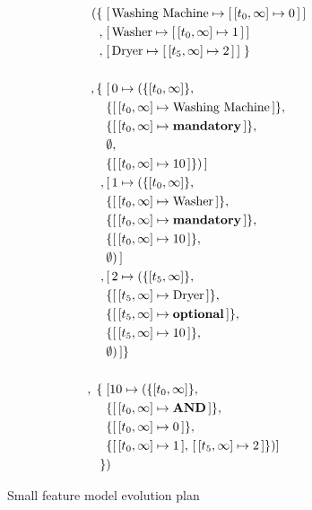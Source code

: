 \begin{figure}
  \begin{align*}
    ( \{ \; & \mapping{\text{Washing Machine}}{\intervalmapping{t_0}{\forever}{0}} \\
       ,\; & \mapping{\text{Washer}}{\intervalmapping{t_0}{\forever}{1}} \\
       ,\; & \mapping{\text{Dryer}}{\intervalmapping{t_5}{\forever}{2}}\; \} \\
       \\
       ,\{\; & \mapping{0}{(\{ \interval{t_0}{\forever}\} ,\, \\
             & \{\intervalmapping{t_0}{\forever}{\text{Washing Machine}}\} ,\, \\
             & \{\intervalmapping{t_0}{\forever}{\textbf{mandatory}}\} ,\, \\
             &  \emptyset ,\, \\ 
             & \{\intervalmapping{t_0}{\forever}{10}\} ) } \\
             ,\, & \mapping{1}{(\{\interval{t_0}{\forever}\} ,\, \\
             & \{\intervalmapping{t_0}{\forever}{\text{Washer}}\} ,\, \\
             & \{\intervalmapping{t_0}{\forever}{\textbf{mandatory}}\} ,\, \\
             &  \{\intervalmapping{t_0}{\forever}{10}\} ,\, \\ 
             & \emptyset)} \\
             ,\, & \mapping{2}{(\{\interval{t_5}{\forever}\} ,\, \\
             & \{\intervalmapping{t_5}{\forever}{\text{Dryer}}\} ,\, \\
             & \{\intervalmapping{t_5}{\forever}{\textbf{optional}}\} ,\, \\
             &  \{\intervalmapping{t_5}{\forever}{10}\} ,\, \\ 
             & \emptyset)} \}\\
             \\
               ,\; \{ \; & [ 10 \mapsto (\{\interval{t_0}{\forever}\} ,\, \\
                         & \{\intervalmapping{t_0}{\forever}{\textbf{AND}}\} ,\, \\
                         & \{\intervalmapping{t_0}{\forever}{0}\} ,\, \\
                         & \{\intervalmapping{t_0}{\forever}{1},\, \intervalmapping{t_5}{\forever}{2}\} ) ]\\
    \}&)\\
  \end{align*}
  \caption{Small feature model evolution plan}
  \label{ex:washing-machine}
\end{figure}



